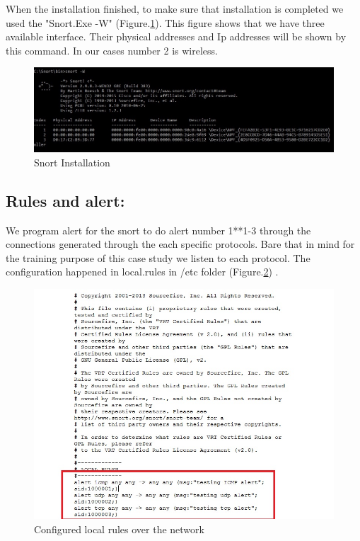 \documentclass{article}
\begin{document}
When the installation finished, to make sure that installation is completed we used the "Snort.Exe -W" (Figure.\ref{fig:SnortIns}). This figure shows that we have three available interface. Their physical addresses and Ip addresses  will be shown by this command. In our cases number 2 is  wireless.


\begin{figure}[H]
	\begin{center}
		\includegraphics[width=0.6
\textwidth]{SnortIns.jpg}
	\end{center}
	\caption{Snort Installation}
	\label{fig:SnortIns}
\end{figure}





\subsection{Rules and alert:}

We program alert for the snort to do alert number 1**1-3 through the connections generated through the each specific protocols. Bare that in mind for the training purpose of this case study we listen to each protocol. The configuration happened in local.rules in /etc folder (Figure.\ref{fig:Localnet}) .

\begin{figure}[H]
	\begin{center}
		\includegraphics[width=0.6
\textwidth]{Localnet.jpg}
	\end{center}
	\caption{Configured local rules over the network}
	\label{fig:Localnet}
\end{figure}
\end{document}

